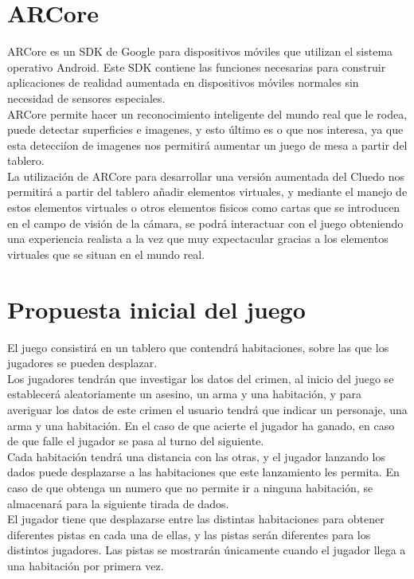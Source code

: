 \section{ARCore}
ARCore es un SDK de Google para dispositivos móviles que utilizan el sistema operativo Android. Este SDK contiene las funciones necesarias para construir aplicaciones de realidad aumentada en dispositivos móviles normales sin necesidad de sensores especiales.\\

ARCore permite hacer un reconocimiento inteligente del mundo real que le rodea, puede detectar superficies e imagenes, y esto último es o que nos interesa, ya que esta detecciíon de imagenes nos permitirá aumentar un juego de mesa a partir del tablero.\\

La utilización de ARCore para desarrollar una versión aumentada del Cluedo nos permitirá a partir del tablero añadir elementos virtuales, y mediante el manejo de estos elementos virtuales o otros elementos fisicos como cartas que se introducen en el campo de visión de la cámara, se podrá interactuar con el juego obteniendo una experiencia realista a la vez que muy expectacular gracias a los elementos virtuales que se situan en el mundo real.

\section{Propuesta inicial del juego}
El juego consistirá en un tablero que contendrá habitaciones, sobre las que los jugadores se pueden desplazar.\\

Los jugadores tendrán que investigar los datos del crimen, al inicio del juego se establecerá aleatoriamente un asesino, un arma y una habitación, y para averiguar los datos de este crimen el usuario tendrá que indicar un personaje, una arma y una habitación. En el caso de que acierte el jugador ha ganado, en caso de que falle el jugador se pasa al turno del siguiente.\\

Cada habitación tendrá una distancia con las otras, y el jugador lanzando los dados puede desplazarse a las habitaciones que este lanzamiento les permita. En caso de que obtenga un numero que no permite ir a ninguna habitación, se almacenará para la siguiente tirada de dados.\\

El jugador tiene que desplazarse entre las distintas habitaciones para obtener diferentes pistas en cada una de ellas, y las pistas serán diferentes para los distintos jugadores. Las pistas se mostrarán únicamente cuando el jugador llega a una habitación por primera vez.\\

